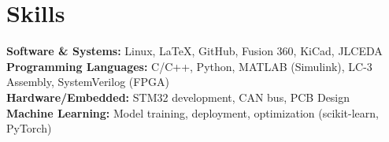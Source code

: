 \documentclass[a4paper,10pt]{article}
\begin{document}
\section*{Skills}
\textbf{Software \& Systems:} Linux, LaTeX, GitHub, Fusion 360, KiCad, JLCEDA\\
\textbf{Programming Languages:} C/C++, Python, MATLAB (Simulink), LC-3 Assembly, SystemVerilog (FPGA)\\
\textbf{Hardware/Embedded:} STM32 development, CAN bus, PCB Design\\
\textbf{Machine Learning:} Model training, deployment, optimization (scikit-learn, PyTorch)\\
\end{document}
